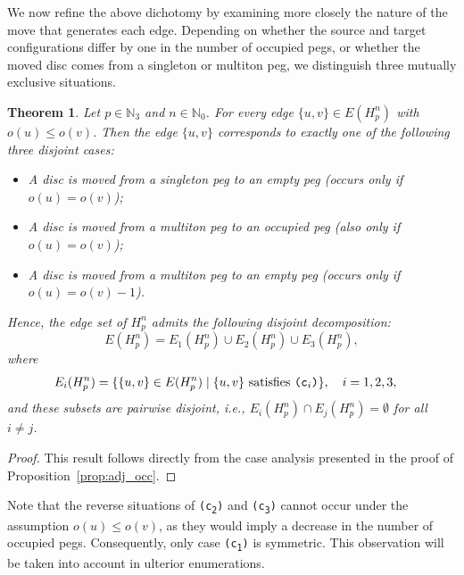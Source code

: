 \documentclass[letterpaper,12pt]{article}
\newtheorem{theorem}{Theorem}
\begin{document}
 

We now refine the above dichotomy by examining more closely the nature of the move that generates each edge.  
Depending on whether the source and target configurations differ by one in the number of occupied pegs, or whether the moved disc comes from a singleton or multiton peg, we distinguish three mutually exclusive situations.
\begin{theorem}\label{thm:edge_partition}
Let $p \in \mathbb{N}_3$ and $n \in \mathbb{N}_0$.  
For every edge $\{u, v\} \in E(H_p^n)$ with $o(u) \leq o(v)$. Then the edge $\{u, v\}$ corresponds to exactly one of the following three disjoint cases:
\begin{itemize}
    \item[$(\texttt{c}_{1})$] A disc is moved from a singleton peg to an empty peg (occurs only if $o(u) = o(v)$);
    \item[$(\texttt{c}_{2})$] A disc is moved from a multiton peg to an occupied peg (also only if $o(u) = o(v)$);
    \item[$(\texttt{c}_{3})$] A disc is moved from a multiton peg to an empty peg (occurs only if $o(u) = o(v) - 1$).
\end{itemize}

Hence, the edge set of $H_p^n$ admits the following disjoint decomposition:
\begin{equation}
    E(H_p^n) = E_1(H_p^n) \cup E_2(H_p^n) \cup E_3(H_p^n),
\end{equation}
where
\begin{align}
    E_i(H_p^n) &= \{\{u, v\} \in E(H_p^n) \mid \text{$\{u,v\}$ satisfies \texttt{(c\textsubscript{$i$})}}\}, \quad i = 1, 2, 3,
\end{align}
and these subsets are pairwise disjoint, i.e., $E_i(H_p^n) \cap E_j(H_p^n) = \emptyset$ for all $i \neq j$.
\end{theorem}

\begin{proof}
This result follows directly from the case analysis presented in the proof of Proposition~\ref{prop:adj_occ}.
\end{proof}

Note that the reverse situations of \texttt{(c\textsubscript{2})} and \texttt{(c\textsubscript{3})} cannot occur under the assumption \(o(u) \leq o(v)\), as they would imply a decrease in the number of occupied pegs. Consequently, only case \texttt{(c\textsubscript{1})} is symmetric. This observation will be taken into account in ulterior enumerations.
\end{document}
